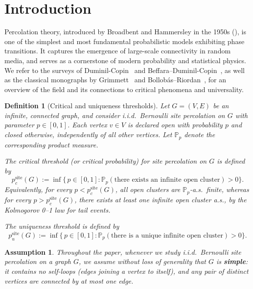 \documentclass[11pt]{amsart}
\theoremstyle{plain}
\newtheorem{definition}[theorem]{Definition}
\newtheorem{assumption}[theorem]{Assumption}
\numberwithin{equation}{section}
\numberwithin{figure}{section}
\begin{document}
\section{Introduction}

Percolation theory, introduced by Broadbent and Hammersley in the 1950s (\cite{BH57}),
is one of the simplest and most fundamental probabilistic models exhibiting phase transitions.
It captures the emergence of large-scale connectivity in random media,
and serves as a cornerstone of modern probability and statistical physics.
We refer to the surveys of Duminil-Copin~\cite{DuminilCopin2017Sixty}
and Beffara--Duminil-Copin~\cite{BeffaraDuminilCopin2013},
as well as the classical monographs by Grimmett~\cite{Grimmett1999}
and Bollob{\'a}s--Riordan~\cite{BollobasRiordan2006},
for an overview of the field and its connections to critical phenomena and universality.

\medskip

\begin{definition}[Critical and uniqueness thresholds]\label{def:pc_pu}
Let \(G = (V,E)\) be an infinite, connected graph, and consider i.i.d.\ Bernoulli site percolation on \(G\) with parameter \(p \in [0,1]\).
Each vertex \(v \in V\) is declared \emph{open} with probability \(p\) and \emph{closed} otherwise, independently of all other vertices.
Let \(\mathbb{P}_p\) denote the corresponding product measure.

\smallskip
\noindent
The \emph{critical threshold} (or \emph{critical probability}) for site percolation on \(G\) is defined by
\[
  p_c^{\mathrm{site}}(G)
  := \inf\bigl\{\, p \in [0,1] :
    \mathbb{P}_p(\text{there exists an infinite open cluster}) > 0
  \bigr\}.
\]
Equivalently, for every \(p < p_c^{\mathrm{site}}(G)\), all open clusters are \(\mathbb{P}_p\)-a.s.\ finite, whereas for every \(p > p_c^{\mathrm{site}}(G)\), there exists at least one infinite open cluster a.s., by the Kolmogorov 0--1 law for tail events.

\smallskip
\noindent
The \emph{uniqueness threshold} is defined by
\begin{equation}\label{dpu}
  p_u^{\mathrm{site}}(G)
  := \inf\bigl\{\, p \in [0,1] :
     \mathbb{P}_p(\text{there is a unique infinite open cluster}) > 0
  \bigr\}.
\end{equation}
\end{definition}

\begin{assumption}\label{ap12}
Throughout the paper, whenever we study i.i.d.~Bernoulli site percolation on a graph $G$, we assume \emph{without loss of generality} that $G$ is \textbf{simple}: it contains no self-loops (edges joining a vertex to itself), and any pair of distinct vertices are connected by at most one edge.
\end{assumption}
\end{document}
